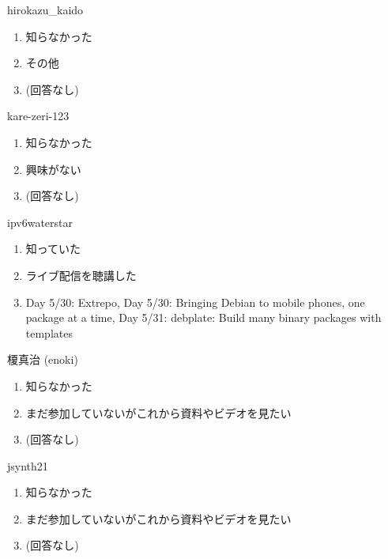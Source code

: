 \begin{prework}{ hirokazu\_kaido }
  \begin{enumerate}
  \item 知らなかった
  \item その他
  \item (回答なし)
  \end{enumerate}
\end{prework}

\begin{prework}{ kare-zeri-123 }
  \begin{enumerate}
  \item 知らなかった
  \item 興味がない
  \item (回答なし)
  \end{enumerate}
\end{prework}

\begin{prework}{ ipv6waterstar }
  \begin{enumerate}
  \item 知っていた
  \item ライブ配信を聴講した
  \item Day 5/30: Extrepo, Day 5/30: Bringing Debian to mobile phones, one package at a time, Day 5/31: debplate: Build many binary packages with templates
  \end{enumerate}
\end{prework}

\begin{prework}{ 榎真治 (enoki) }
  \begin{enumerate}
  \item 知らなかった
  \item まだ参加していないがこれから資料やビデオを見たい
  \item (回答なし)
  \end{enumerate}
\end{prework}

\begin{prework}{ jsynth21 }
  \begin{enumerate}
  \item 知らなかった
  \item まだ参加していないがこれから資料やビデオを見たい
  \item (回答なし)
  \end{enumerate}
\end{prework}
